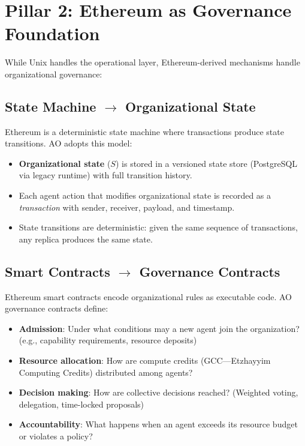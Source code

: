 \documentclass[11pt,a4paper]{article}
\begin{document}
\section{Pillar 2: Ethereum as Governance Foundation}

While Unix handles the operational layer, Ethereum-derived mechanisms handle
organizational governance:

\subsection{State Machine $\rightarrow$ Organizational State}

Ethereum is a deterministic state machine where transactions produce
state transitions. AO adopts this model:

\begin{itemize}[nosep]
  \item \textbf{Organizational state} ($S$) is stored in a versioned state
    store (PostgreSQL via legacy runtime) with full transition history.
  \item Each agent action that modifies organizational state is recorded as a
    \emph{transaction} with sender, receiver, payload, and timestamp.
  \item State transitions are deterministic: given the same sequence of
    transactions, any replica produces the same state.
\end{itemize}

\subsection{Smart Contracts $\rightarrow$ Governance Contracts}

Ethereum smart contracts encode organizational rules as executable code. AO
governance contracts define:

\begin{itemize}[nosep]
  \item \textbf{Admission}: Under what conditions may a new agent join the
    organization? (e.g., capability requirements, resource deposits)
  \item \textbf{Resource allocation}: How are compute credits (GCC---Etzhayyim
    Computing Credits) distributed among agents?
  \item \textbf{Decision making}: How are collective decisions reached?
    (Weighted voting, delegation, time-locked proposals)
  \item \textbf{Accountability}: What happens when an agent exceeds its
    resource budget or violates a policy?
\end{itemize}
\end{document}
